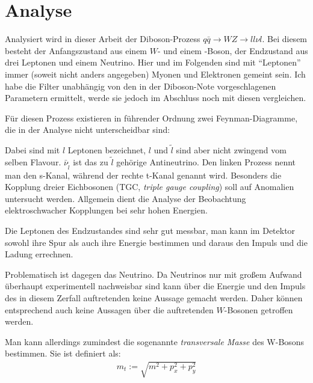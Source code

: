 \section{Analyse}
\label{cha:analyse}
Analysiert wird in dieser Arbeit der Diboson-Prozess $q\bar{q}\to WZ\to ll\nu
l$. Bei diesem besteht der Anfangszustand aus einem $W$- und einem \Z-Boson, der
Endzustand aus drei Leptonen und einem Neutrino.  Hier und im Folgenden sind mit
"`Leptonen"' immer (soweit nicht anders angegeben) Myonen und Elektronen gemeint
sein. Ich habe die Filter unabhängig von den in der Diboson-Note vorgeschlagenen
Parametern\cite{diboson-ana} ermittelt, werde sie jedoch im Abschluss noch mit
diesen vergleichen.

Für diesen Prozess existieren in führender Ordnung zwei Feynman-Diagramme, die
in der Analyse nicht unterscheidbar sind: \\
\begin{center}
   \hspace{2cm}
  
\end{center}

Dabei sind mit $l$ Leptonen bezeichnet, $l$ und $\tilde l$ sind aber nicht
zwingend vom selben Flavour. $\bar \nu_{\tilde l}$ ist das zu $\tilde l$
gehörige Antineutrino. Den linken Prozess nennt man den s-Kanal, während der
rechte t-Kanal genannt wird. Besonders die Kopplung dreier Eichbosonen
(TGC, \emph{triple gauge coupling}) soll auf Anomalien untersucht werden.
Allgemein dient die Analyse der Beobachtung elektroschwacher Kopplungen bei sehr
hohen Energien.

Die Leptonen des Endzustandes sind sehr gut messbar, man kann im Detektor sowohl
ihre Spur als auch ihre Energie bestimmen und daraus den Impuls und die Ladung
errechnen.

Problematisch ist dagegen das Neutrino. Da Neutrinos nur mit großem Aufwand
überhaupt experimentell nachweisbar sind\cite{needed} kann über die Energie und
den Impuls des in diesem Zerfall auftretenden keine Aussage gemacht werden.
Daher können entsprechend auch keine Aussagen über die auftretenden $W$-Bosonen
getroffen werden.

\label{cha:met}
Man kann allerdings zumindest die sogenannte \emph{transversale Masse} des
W-Bosons bestimmen. Sie ist definiert als:
\begin{align}
  m_t := \sqrt{m^2 + p_x^2 + p_y^2}
  \label{def:trans}
\end{align}

